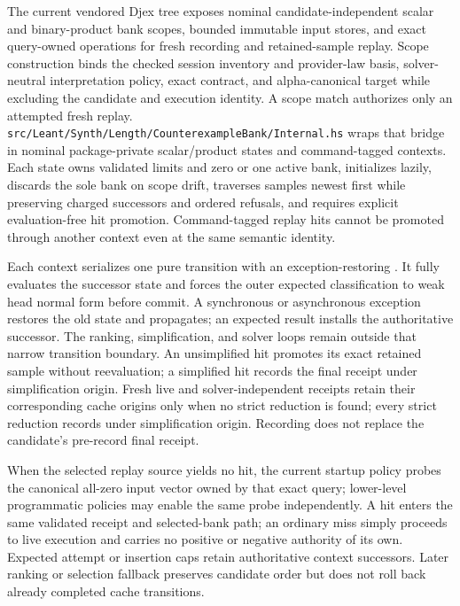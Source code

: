 \documentclass[10pt,letterpaper,oneside]{report}
\newcommand{\code}[1]{\texttt{\detokenize{#1}}}
\newcommand{\filepath}[1]{\nolinkurl{#1}}
\begin{document}
The current vendored Djex tree exposes nominal candidate-independent scalar and binary-product bank scopes, bounded immutable input stores, and exact query-owned operations for fresh recording and retained-sample replay. Scope construction binds the checked session inventory and provider-law basis, solver-neutral interpretation policy, exact contract, and alpha-canonical target while excluding the candidate and execution identity. A scope match authorizes only an attempted fresh replay. \filepath{src/Leant/Synth/Length/CounterexampleBank/Internal.hs} wraps that bridge in nominal package-private scalar/product states and command-tagged contexts. Each state owns validated limits and zero or one active bank, initializes lazily, discards the sole bank on scope drift, traverses samples newest first while preserving charged successors and ordered refusals, and requires explicit evaluation-free hit promotion. Command-tagged replay hits cannot be promoted through another context even at the same semantic identity.

Each context serializes one pure transition with an exception-restoring \code{MVar}. It fully evaluates the successor state and forces the outer expected classification to weak head normal form before commit. A synchronous or asynchronous exception restores the old state and propagates; an expected result installs the authoritative successor. The ranking, simplification, and solver loops remain outside that narrow transition boundary. An unsimplified hit promotes its exact retained sample without reevaluation; a simplified hit records the final receipt under simplification origin. Fresh live and solver-independent receipts retain their corresponding cache origins only when no strict reduction is found; every strict reduction records under simplification origin. Recording does not replace the candidate's pre-record final receipt.

When the selected replay source yields no hit, the current startup policy probes the canonical all-zero input vector owned by that exact query; lower-level programmatic policies may enable the same probe independently. A hit enters the same validated receipt and selected-bank path; an ordinary miss simply proceeds to live execution and carries no positive or negative authority of its own. Expected attempt or insertion caps retain authoritative context successors. Later ranking or selection fallback preserves candidate order but does not roll back already completed cache transitions.
\end{document}
